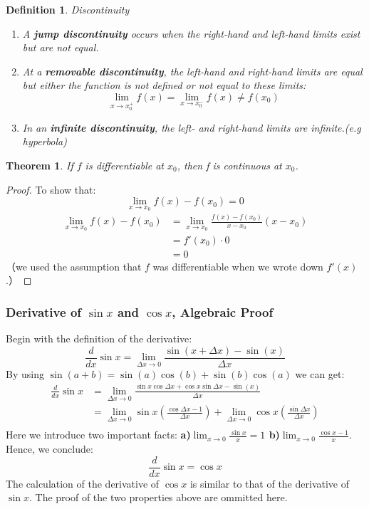 \documentclass[10pt, a4paper]{article}
\newtheorem{theorem}{Theorem}
\newtheorem{definition}{Definition}
\begin{document}
\begin{definition}
    Discontinuity
    \begin{enumerate}
        \item A \textbf{jump discontinuity} occurs when the right-hand and left-hand limits exist but are not equal.
        \item At a \textbf{removable discontinuity}, the left-hand and right-hand limits are equal but
        either the function is not defined or not equal to these limits:
        \[
            \lim_{x\to x_0^+}f(x)=\lim_{x\to x_0^-}f(x)\neq f(x_0)    
        \]
        \item In an \textbf{infinite discontinuity}, the left- and right-hand limits are infinite.(e.g hyperbola)
    \end{enumerate}
\end{definition}

\begin{theorem}
    If $f$ is differentiable at $x_0$, then f is continuous at $x_0$.
\end{theorem}
\begin{proof}
    To show that:
    \[
        \lim_{x\to x_0}f(x) - f(x_0) = 0    
    \]
    \begin{align*}
        \lim_{x\to x_0}f(x) - f(x_0) &= \lim_{x\to x_0}\frac{f(x)-f(x_0)}{x-x_0}(x-x_0)\\
        &= f'(x_0)\cdot 0\\
        &= 0
    \end{align*}
    （we used the assumption that $f$ was differentiable when we wrote down $f'(x)$.）
\end{proof}

\subsubsection*{Derivative of $\sin x$ and $\cos x$, Algebraic Proof}
Begin with the definition of the derivative:
\[
    \frac{d}{dx}\sin x=\lim_{\Delta x\to0}\frac{\sin(x+\Delta x)-\sin(x)}{\Delta x}
\]
By using $\sin(a+b)=\sin(a)\cos(b)+\sin(b)\cos(a)$ we can get:
\[
\begin{aligned}
    \frac{d}{dx}\sin x &=\lim_{\Delta x\to0}\frac{\sin x\cos\Delta x+\cos x\sin\Delta x-\sin(x)}{\Delta x}\\
    &= \lim_{\Delta x\to0}\sin x\left(\frac{\cos\Delta x-1}{\Delta x}\right)+\lim_{\Delta x\to0}\cos x\left(\frac{\sin\Delta x}{\Delta x}\right)\\
\end{aligned}
\]
Here we introduce two important facts: \textbf{a)$\lim_{x\to 0}\frac{\sin x}{x} = 1$ b)$\lim_{x\to 0}\frac{\cos x -1}{x}$}.
Hence, we conclude:
\[
    \frac{d}{dx}\sin x = \cos x
\]
The calculation of the derivative of $\cos x$ is similar to that of the derivative of $\sin x$. 
The proof of the two properties above are ommitted here.
\end{document}
